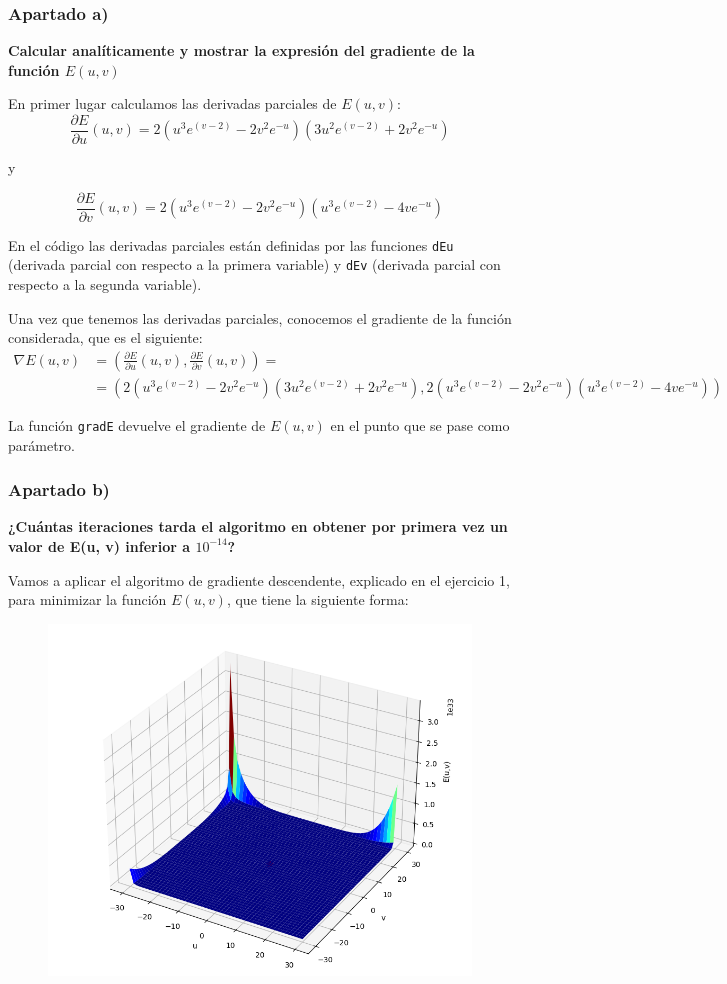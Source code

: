 \documentclass[a4]{article}
\begin{document}
\subsubsection{Apartado a)}
\textbf{Calcular analíticamente y mostrar la expresión del gradiente de la función $E(u, v)$}

En primer lugar calculamos las derivadas parciales de $E(u, v)$:
 \[
\frac{\partial E}{\partial u}(u,v) =
2(u^3e^{(v-2)} - 2v^2e^{-u})(3u^2e^{(v-2)} + 2v^2e^{-u})
\]

y

\[
\frac{\partial E}{\partial v}(u,v) =
2(u^3e^{(v-2)} - 2v^2e^{-u})(u^3e^{(v-2)} - 4ve^{-u})
\]

En el código las derivadas parciales están definidas por las funciones \lstinline|dEu| (derivada parcial con respecto a la primera variable) y \lstinline|dEv| (derivada parcial con respecto a la segunda variable).

Una vez que tenemos las derivadas parciales, conocemos el gradiente de la función considerada, que es el siguiente:
\begin{align*}
\nabla E(u,v) & = (\frac{\partial E}{\partial u}(u,v),\frac{\partial E}{\partial v}(u,v))=\\
& = (2(u^3e^{(v-2)} - 2v^2e^{-u})(3u^2e^{(v-2)} + 2v^2e^{-u}), 2(u^3e^{(v-2)} - 2v^2e^{-u})(u^3e^{(v-2)} - 4ve^{-u}))
\end{align*}

La función \lstinline|gradE| devuelve el gradiente de $E(u,v)$ en el punto que se pase como parámetro.

\subsubsection{Apartado b)}
\textbf{¿Cuántas iteraciones tarda el algoritmo en obtener por primera vez un valor de E(u, v)
inferior a $10^{-14}$?}

Vamos a aplicar el algoritmo de gradiente descendente, explicado en el ejercicio 1, para minimizar la función  $E(u,v)$, que tiene la siguiente forma:
\begin{figure}[H]
	\centering
	\includegraphics[width=0.8\linewidth]{img/Figure_1}
	\caption{}
	\label{fig:figure1}
\end{figure}
\end{document}
